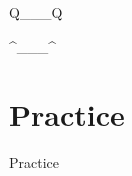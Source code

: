\documentclass[t]{beamer}
\begin{document}
\begin{frame}{Q\_\_\_Q}
  \begin{minipage}[t]{.40\textwidth}
    
  \end{minipage}
  \begin{minipage}[t]{.40\textwidth}
    
  \end{minipage}
\end{frame}

\begin{frame}{\textasciicircum\_\_\_\textasciicircum}
  
\end{frame}

\section{Practice}
\begin{frame}{Practice}
\end{frame}
\end{document}
